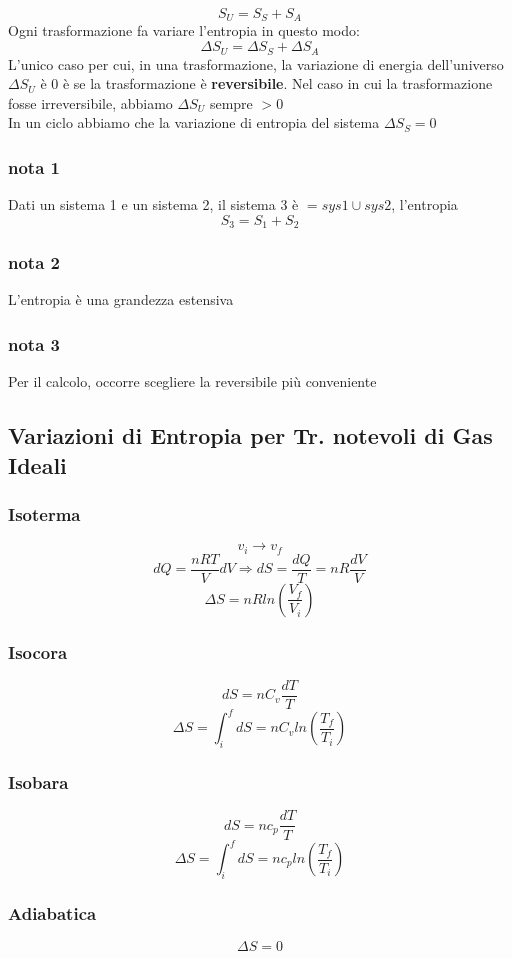 \documentclass[a4paper]{report}
\begin{document}
  $$ S_U = S_S + S_A$$
  Ogni trasformazione fa variare l'entropia in questo modo:
  $$ \Delta S_U = \Delta S_S + \Delta S_A$$
  L'unico caso per cui, in una trasformazione, la variazione di energia dell'universo $\Delta S_U$ è $0$ è se la trasformazione è \textbf{reversibile}. Nel caso in cui la trasformazione fosse irreversibile, abbiamo $\Delta S_U$ sempre $>0$\\
  In un ciclo abbiamo che la variazione di entropia del sistema $\Delta S_S = 0$ 

  \subsubsection{nota 1}
  Dati un sistema 1 e un sistema 2, il sistema 3 è $= sys1 \cup sys2$, l'entropia
  $$ S_3 = S_1 + S_2 $$
  \subsubsection{nota 2}
  L'entropia è una grandezza estensiva
  \subsubsection{nota 3}
  Per il calcolo, occorre scegliere la reversibile più conveniente
  \subsection{Variazioni di Entropia per Tr. notevoli di Gas Ideali}
  \subsubsection{Isoterma}
  $$ v_i \rightarrow v_f$$
  $$ dQ = \frac{nRT}{V} dV \Rightarrow dS = \frac{dQ}{T} = nR\frac{dV}{V} $$
  $$ \Delta S = nR ln(\frac{V_f}{V_i}) $$

  \subsubsection{Isocora}
  $$ dS = nC_v\frac{dT}{T} $$
  $$ \Delta S = \int_i^f dS = nC_v ln(\frac{T_f}{T_i}) $$

  \subsubsection{Isobara}
  $$ dS = nc_p\frac{dT}{T} $$
  $$ \Delta S = \int_i^f dS = n c_p ln(\frac{T_f}{T_i})$$

  \subsubsection{Adiabatica}
  $$ \Delta S = 0 $$
\end{document}

